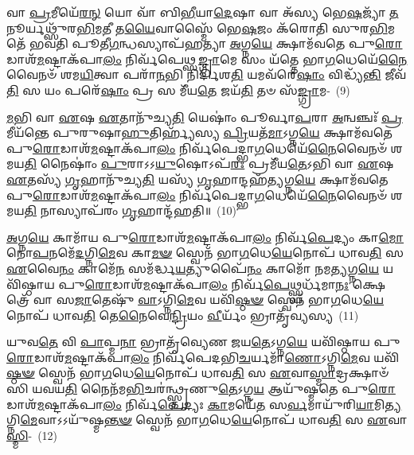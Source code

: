 𑌵𑌾 \ul{𑌪𑍍𑌰}\-𑌮𑍀𑌯𑍇᳴\-\ul{𑌰}\-\-\ul{𑌨𑍍} 𑌯𑍋 𑌵𑌾᳴ 𑌬𑌿\-\ul{𑌭𑍀}\-𑌯𑌾\-\ul{𑌦𑍇}\-𑌷𑌾 𑌵𑌾 𑌅᳴𑌸𑍍𑌯 𑌭𑍇\-\ul{𑌷}\-𑌜𑍍𑌯𑌾᳴ \ul{𑌤}\-𑌨𑍂𑌰𑍍𑌯𑌥𑍍𑌸𑍁᳴𑌰\-\ul{𑌭𑌿}\-𑌮\-\ul{𑌤𑍀} 𑌤\-\ul{𑌯𑍈}\-𑌵𑌾𑌸𑍍𑌮𑍈᳴ 𑌭𑍇\-\ul{𑌷}\-𑌜𑌂 𑌕᳴𑌰𑍋𑌤𑌿 𑌸𑍁𑌰\-\ul{𑌭𑌿}\-𑌮𑌤𑍇᳴ 𑌭𑌵𑌤𑌿 𑌪𑍂𑌤𑍀\-\ul{𑌗}\-𑌨𑍍𑌧𑌸𑍍𑌯𑌾𑌪᳴𑌹𑌤𑍍𑌯𑌾 \ul{𑌅}\-𑌗𑍍𑌨\-\ul{𑌯𑍇} 𑌕𑍍𑌷𑌾𑌮᳴𑌵𑌤𑍇 𑌪𑍁\-\ul{𑌰𑍋}\-𑌡𑌾𑌶᳴\-\-\ul{𑌮}\-𑌷𑍍𑌟𑌾\-𑌕᳴𑌪𑌾\-\ul{𑌲𑌂} 𑌨𑌿𑌰𑍍𑌵᳴𑌪𑍇𑌥𑍍𑌸\-\ul{𑌙𑍍𑌗𑍍𑌰𑌾}\-𑌮𑍇 𑌸𑌂 𑌯᳴𑌤𑍍𑌤𑍇 𑌭𑌾\-\ul{𑌗}\-𑌧𑍇𑌯𑍇᳴\-\ul{𑌨𑍈}\-𑌵𑍈𑌨𑍞᳴ 𑌶𑌮\-\ul{𑌯𑌿}\-𑌤𑍍𑌵𑌾 𑌪𑌰𑌾᳴\-\ul{𑌨}\-𑌭𑌿 𑌨𑌿𑌰𑍍𑌦𑌿᳴𑌶\-\ul{𑌤𑌿} 𑌯𑌮𑌵᳴𑌰𑍇\-\ul{𑌷𑌾𑌂} 𑌵𑌿𑌦𑍍𑌧𑍍𑌯᳴\-\ul{𑌨𑍍𑌤𑌿} 𑌜𑍀𑌵᳴\-\ul{𑌤𑌿} 𑌸 𑌯𑌂 𑌪𑌰𑍇᳴\-\ul{𑌷𑌾𑌂} 𑌪𑍍𑌰 𑌸 𑌮𑍀᳴𑌯\-\ul{𑌤𑍇} 𑌜𑌯᳴\-\ul{𑌤𑌿} 𑌤𑍞 𑌸᳴\-\ul{𑌙𑍍𑌗𑍍𑌰𑌾}\-𑌮-~(9)

\-\ul{𑌮}\-𑌭𑌿 𑌵𑌾 \ul{𑌏}\-𑌷 \ul{𑌏}\-𑌤𑌾𑌨𑍁᳴𑌚𑍍𑌯\-\ul{𑌤𑌿} 𑌯𑍇𑌷𑌾𑌂॑ 𑌪𑍂𑌰𑍍𑌵𑌾\-\ul{𑌪}\-𑌰𑌾 \ul{𑌅}\-𑌨𑍍𑌵𑌞𑍍𑌚𑌃᳴ \ul{𑌪𑍍𑌰}\-𑌮𑍀𑌯᳴𑌨𑍍𑌤𑍇 𑌪𑍁𑌰𑍁𑌷𑌾\-\ul{𑌹𑍁}\-𑌤𑌿𑌰𑍍𑌹𑍍𑌯᳴𑌸𑍍𑌯 \ul{𑌪𑍍𑌰𑌿}\-𑌯𑌤᳴\-\ul{𑌮𑌾}\-\-𑌽𑌗𑍍𑌨\-\ul{𑌯𑍇} 𑌕𑍍𑌷𑌾𑌮᳴𑌵𑌤𑍇 𑌪𑍁\-\ul{𑌰𑍋}\-𑌡𑌾𑌶᳴\-\-\ul{𑌮}\-𑌷𑍍𑌟𑌾\-𑌕᳴𑌪𑌾\-\ul{𑌲𑌂} 𑌨𑌿𑌰𑍍𑌵᳴𑌪𑍇𑌦𑍍𑌭𑌾\-\ul{𑌗}\-𑌧𑍇𑌯𑍇᳴\-\ul{𑌨𑍈}\-𑌵𑍈𑌨𑍞᳴ 𑌶𑌮𑌯\-\ul{𑌤𑌿} 𑌨𑍈𑌷𑌾𑌂॑ \ul{𑌪𑍁}\-𑌰𑌾\-𑌽\-𑌽\-\ul{𑌯𑍁}\-𑌷𑍋\-𑌽𑌪᳴\-\ul{𑌰𑌃} 𑌪𑍍𑌰𑌮𑍀᳴𑌯\-\ul{𑌤𑍇}\-\-𑌽𑌭𑌿 𑌵𑌾 \ul{𑌏}\-𑌷 \ul{𑌏}\-𑌤𑌸𑍍𑌯᳴ \ul{𑌗𑍃}\-𑌹𑌾𑌨𑍁᳴𑌚𑍍𑌯\-\ul{𑌤𑌿} 𑌯𑌸𑍍𑌯᳴ \ul{𑌗𑍃}\-𑌹𑌾𑌨𑍍𑌦𑌹᳴\-\ul{𑌤𑍍𑌯}\-𑌗𑍍𑌨\-\ul{𑌯𑍇} 𑌕𑍍𑌷𑌾𑌮᳴𑌵𑌤𑍇 𑌪𑍁\-\ul{𑌰𑍋}\-𑌡𑌾𑌶᳴\-\-\ul{𑌮}\-𑌷𑍍𑌟𑌾\-𑌕᳴𑌪𑌾\-\ul{𑌲𑌂} 𑌨𑌿𑌰𑍍𑌵᳴𑌪𑍇𑌦𑍍𑌭𑌾\-\ul{𑌗}\-𑌧𑍇𑌯𑍇᳴\-\ul{𑌨𑍈}\-𑌵𑍈𑌨𑍞᳴ 𑌶𑌮𑌯\-\ul{𑌤𑌿} 𑌨𑌾𑌸𑍍𑌯𑌾𑌪᳴𑌰𑌂 \ul{𑌗𑍃}\-𑌹𑌾𑌨𑍍𑌦᳴𑌹𑌤𑌿॥~(10)

{\anuvakamend[{\-\ul{𑌵𑍍𑌰}\-𑌤𑌪᳴𑌤\-\ul{𑌯𑍇} 𑌨𑌿𑌶𑌿᳴𑌤𑌾\-\ul{𑌯𑌾}\-𑌨𑍍𑌨𑌿𑌰𑍍𑌵᳴\-\ul{𑌪𑍇}\-𑌤𑍍𑌪𑍁𑌰𑍁᳴𑌷𑌾𑌃 𑌸\-\ul{𑌙𑍍𑌗𑍍𑌰𑌾}\-𑌮𑌨𑍍𑌨 \ul{𑌚}\-𑌤𑍍𑌵𑌾𑌰𑌿᳴ 𑌚}]}%

\-\ul{𑌅}\-𑌗𑍍𑌨\-\ul{𑌯𑍇} 𑌕𑌾𑌮𑌾᳴𑌯 𑌪𑍁\-\ul{𑌰𑍋}\-𑌡𑌾𑌶᳴\-\-\ul{𑌮}\-𑌷𑍍𑌟𑌾\-𑌕᳴𑌪𑌾\-\ul{𑌲𑌂} 𑌨𑌿𑌰𑍍𑌵᳴\-\ul{𑌪𑍇}\-𑌦𑍍𑌯𑌂 𑌕𑌾\-\ul{𑌮𑍋} 𑌨𑍋\-\ul{𑌪}\-𑌨𑌮𑍇᳴\-\ul{𑌦}\-𑌗𑍍𑌨𑌿\-\ul{𑌮𑍇}\-𑌵 𑌕𑌾\-\ul{𑌮}\-\-\ul{𑍟} 𑌸𑍍𑌵𑍇𑌨᳴ 𑌭𑌾\-\ul{𑌗}\-𑌧𑍇\-\ul{𑌯𑍇}\-𑌨𑍋𑌪᳴ 𑌧𑌾𑌵\-\ul{𑌤𑌿} 𑌸 \ul{𑌏}\-𑌵𑍈\-\ul{𑌨𑌂} 𑌕𑌾𑌮𑍇᳴\-\ul{𑌨} 𑌸𑌮᳴𑌰𑍍𑌦𑍍𑌧\-\ul{𑌯}\-𑌤𑍍𑌯𑍁𑌪𑍈᳴\-\ul{𑌨𑌂} 𑌕𑌾𑌮𑍋᳴ 𑌨𑌮\-\ul{𑌤𑍍𑌯}\-𑌗𑍍𑌨\-\ul{𑌯𑍇} 𑌯𑌵𑌿᳴𑌷𑍍𑌠𑌾𑌯 𑌪𑍁\-\ul{𑌰𑍋}\-𑌡𑌾𑌶᳴\-\-\ul{𑌮}\-𑌷𑍍𑌟𑌾\-𑌕᳴𑌪𑌾\-\ul{𑌲𑌂} 𑌨𑌿𑌰𑍍𑌵᳴\-\ul{𑌪𑍇}\-𑌥𑍍𑌸𑍍𑌪𑌰𑍍𑌧᳴𑌮𑌾\-\ul{𑌨𑌃} 𑌕𑍍𑌷𑍇𑌤𑍍𑌰𑍇᳴ 𑌵𑌾 𑌸\-\ul{𑌜𑌾}\-𑌤𑍇𑌷𑍁᳴ \ul{𑌵𑌾}\-\-𑌽𑌗𑍍𑌨𑌿\-\ul{𑌮𑍇}\-𑌵 𑌯𑌵𑌿᳴\-\ul{𑌷𑍍𑌠}\-\-\ul{𑍟} 𑌸𑍍𑌵𑍇𑌨᳴ 𑌭𑌾\-\ul{𑌗}\-𑌧𑍇\-\ul{𑌯𑍇}\-𑌨𑍋𑌪᳴ 𑌧𑌾𑌵\-\ul{𑌤𑌿} 𑌤𑍇\-\ul{𑌨𑍈}\-𑌵𑍇\-\ul{𑌨𑍍𑌦𑍍𑌰𑌿}\-𑌯𑌂 \ul{𑌵𑍀}\-𑌰𑍍𑌯𑌂᳴ 𑌭𑍍𑌰𑌾𑌤𑍃᳴𑌵𑍍𑌯𑌸𑍍𑌯~(11)

𑌯𑍁𑌵\-\ul{𑌤𑍇} 𑌵𑌿 \ul{𑌪𑌾}\-𑌪𑍍𑌮\-\ul{𑌨𑌾} 𑌭𑍍𑌰𑌾𑌤𑍃᳴𑌵𑍍𑌯𑍇𑌣 𑌜𑌯\-\ul{𑌤𑍇}\-\-𑌽𑌗𑍍𑌨\-\ul{𑌯𑍇} 𑌯𑌵𑌿᳴𑌷𑍍𑌠𑌾𑌯 𑌪𑍁\-\ul{𑌰𑍋}\-𑌡𑌾𑌶᳴\-\-\ul{𑌮}\-𑌷𑍍𑌟𑌾\-𑌕᳴𑌪𑌾\-\ul{𑌲𑌂} 𑌨𑌿𑌰𑍍𑌵᳴𑌪𑍇𑌦𑌭𑌿\-\ul{𑌚}\-𑌰𑍍𑌯𑌮𑌾᳴\-\ul{𑌣𑍋}\-\-𑌽𑌗𑍍𑌨𑌿\-\ul{𑌮𑍇}\-𑌵 𑌯𑌵𑌿᳴\-\ul{𑌷𑍍𑌠}\-\-\ul{𑍟} 𑌸𑍍𑌵𑍇𑌨᳴ 𑌭𑌾\-\ul{𑌗}\-𑌧𑍇\-\ul{𑌯𑍇}\-𑌨𑍋𑌪᳴ 𑌧𑌾𑌵\-\ul{𑌤𑌿} 𑌸 \ul{𑌏}\-𑌵𑌾\-\ul{𑌸𑍍𑌮𑌾}\-𑌦𑍍𑌰𑌕𑍍𑌷𑌾𑍞᳴𑌸𑌿 𑌯𑌵𑌯\-\ul{𑌤𑌿} 𑌨𑍈𑌨᳴𑌮\-\ul{𑌭𑌿}\-𑌚𑌰॑𑌨𑍍𑌥𑍍𑌸𑍍𑌤𑍃𑌣𑍁\-\ul{𑌤𑍇}\-\-𑌽𑌗𑍍𑌨\-\ul{𑌯} 𑌆𑌯𑍁᳴𑌷𑍍𑌮𑌤𑍇 𑌪𑍁\-\ul{𑌰𑍋}\-𑌡𑌾𑌶᳴\-\-\ul{𑌮}\-𑌷𑍍𑌟𑌾\-𑌕᳴𑌪𑌾\-\ul{𑌲𑌂} 𑌨𑌿𑌰𑍍𑌵᳴\-\ul{𑌪𑍇}\-𑌦𑍍𑌯𑌃 \ul{𑌕𑌾}\-𑌮𑌯𑍇᳴\-\ul{𑌤} 𑌸\-\ul{𑌰𑍍𑌵}\-𑌮𑌾𑌯𑍁᳴𑌰𑌿\-\ul{𑌯𑌾}\-𑌮𑌿\-\ul{𑌤𑍍𑌯}\-𑌗𑍍𑌨𑌿\-\ul{𑌮𑍇}\-𑌵𑌾𑌽𑌽𑌯𑍁᳴𑌷𑍍𑌮\-\ul{𑌨𑍍𑌤}\-\-\ul{𑍟} 𑌸𑍍𑌵𑍇𑌨᳴ 𑌭𑌾\-\ul{𑌗}\-𑌧𑍇\-\ul{𑌯𑍇}\-𑌨𑍋𑌪᳴ 𑌧𑌾𑌵\-\ul{𑌤𑌿} 𑌸 \ul{𑌏}\-𑌵𑌾\-\ul{𑌸𑍍𑌮𑌿}\--~(12)

